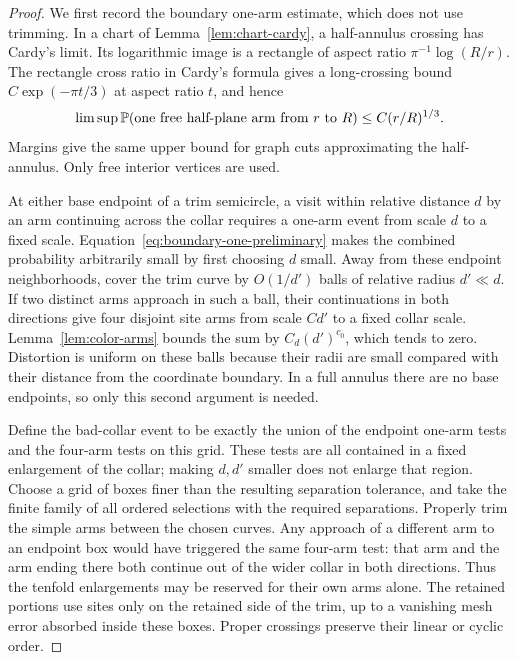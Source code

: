\begin{proof}
We first record the boundary one-arm estimate, which does not
use trimming.  In a chart of Lemma~\ref{lem:chart-cardy}, a
half-annulus crossing has Cardy's limit.  Its logarithmic image
is a rectangle of aspect ratio $\pi^{-1}\log(R/r)$.  The
rectangle cross ratio in Cardy's formula gives a long-crossing
bound $C\exp(-\pi t/3)$ at aspect ratio $t$, and hence
\begin{equation}\label{eq:boundary-one-preliminary}
 \limsup\mathbb P(\text{one free half-plane arm from $r$ to $R$})
       \le C(r/R)^{1/3}.
\end{equation}
Margins give the same upper bound for graph cuts approximating
the half-annulus.  Only free interior vertices are used.

At either base endpoint of a trim semicircle, a visit within
relative distance $d$ by an arm continuing across the collar
requires a one-arm event from scale $d$ to a fixed scale.
Equation~\eqref{eq:boundary-one-preliminary} makes the combined
probability arbitrarily small by first choosing $d$ small.
Away from these endpoint neighborhoods, cover the trim curve
by $O(1/d')$ balls of relative radius $d'\ll d$.  If two
distinct arms approach in such a ball, their continuations in
both directions give four disjoint site arms from scale $Cd'$
to a fixed collar scale.  Lemma~\ref{lem:color-arms} bounds the
sum by $C_d(d')^{c_0}$, which tends to zero.  Distortion is
uniform on these balls because their radii are small compared
with their distance from the coordinate boundary.  In a full
annulus there are no base endpoints, so only this second
argument is needed.

Define the bad-collar event to be exactly the union of the endpoint
one-arm tests and the four-arm tests on this grid.  These tests
are all contained in a fixed enlargement of the collar; making
$d,d'$ smaller does not enlarge that region.  Choose a grid of
boxes finer than the resulting separation tolerance, and take
the finite family of all ordered selections with the required
separations.
Properly trim the simple arms between the chosen curves.  Any
approach of a different arm to an endpoint box would have
triggered the same four-arm test: that arm and the arm ending
there both continue out of the wider collar in both directions.
Thus the tenfold enlargements may be reserved for their own
arms alone.  The retained portions use sites only on the
retained side of the trim, up to a vanishing mesh error absorbed
inside these boxes.  Proper crossings preserve their linear
or cyclic order.
\end{proof}

